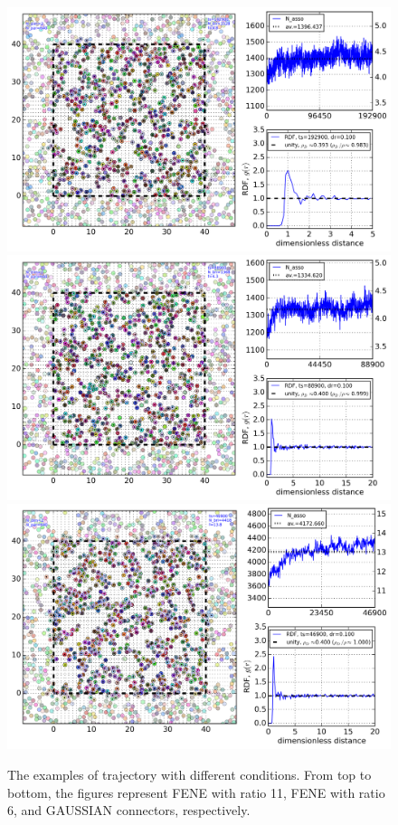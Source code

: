 \documentclass[10pt, a4paper]{report}
\begin{document}
\begin{appendices}
    \begin{figure}
      \centering
      \includegraphics[height=0.3\textheight]{figures/traj_r11.png}\\
      \includegraphics[height=0.3\textheight]{figures/traj_r06.png}\\
      \includegraphics[height=0.3\textheight]{figures/traj_GAUSSIAN.png}
      \caption{The examples of trajectory with different conditions. From top to bottom, the figures represent FENE with ratio 11, FENE with ratio 6, and GAUSSIAN connectors, respectively. }
      \label{fig:traj_compare}
    \end{figure}
    

\end{appendices}
\end{document}
